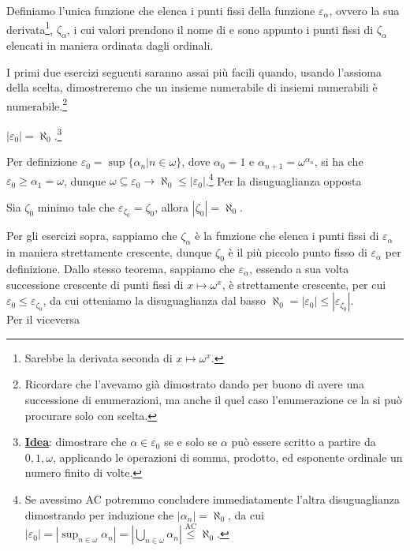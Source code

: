 \begin{definition}
	Definiamo l'unica funzione che elenca i punti fissi della funzione $\varepsilon_\alpha$, ovvero la sua derivata\footnote{Sarebbe la derivata seconda di $x \mapsto \omega^x$.}, $\zeta_\alpha$, i cui valori prendono il nome di  e sono appunto i punti fissi di $\zeta_\alpha$ elencati in maniera ordinata dagli ordinali.
\end{definition}

I primi due esercizi seguenti saranno assai pi\`u facili quando, usando l'assioma della scelta, dimostreremo che un insieme numerabile di insiemi numerabili \`e numerabile.\footnote{Ricordare che l'avevamo gi\`a dimostrato dando per buono di avere una successione di enumerazioni,
ma anche il quel caso l'enumerazione ce la si pu\`o procurare solo con scelta.}

\begin{exercise}[\textcolor{red}{$\star$ Difficile senza leggere l'idea sotto}]
	$|\varepsilon_0| = \aleph_0$.\footnote{\underline{\textbf{Idea}}: dimostrare che $\alpha \in \varepsilon_0$ se e solo se $\alpha$ pu\`o essere scritto a partire da $0,1,\omega$, applicando le operazioni di somma, prodotto, ed esponente ordinale un numero finito di volte.}
\end{exercise}

\begin{soln}
	Per definizione $\varepsilon_0 = \sup\{\alpha_n | n \in \omega\}$, dove $\alpha_0 = 1$ e $\alpha_{n+1}=\omega^{\alpha_n}$, si ha che $\varepsilon_0 \geq \alpha_1 = \omega$, dunque $\omega \subseteq \varepsilon_0 \to \aleph_0 \leq |\varepsilon_0|$.\footnote{Se avessimo AC
	potremmo concludere immediatamente l'altra disuguaglianza dimostrando per induzione che $|\alpha_n| = \aleph_0$, da cui $|\varepsilon_0| = |\sup_{n \in \omega} \alpha_n| = |\bigcup_{n \in \omega} \alpha_n| \overset{\text{AC}}{\leq} \aleph_0$.} Per la
	disuguaglianza opposta
\end{soln}

\begin{exercise}[\textcolor{red}{$\star \star$ Ostico}]
	Sia $\zeta_0$ minimo tale che $\varepsilon_{\zeta_0} = \zeta_0$, allora $|\zeta_0| = \aleph_0$.
\end{exercise}

\begin{soln}
	Per gli esercizi sopra, sappiamo che $\zeta_\alpha$ \`e la funzione che elenca i punti fissi di $\varepsilon_\alpha$ in maniera strettamente crescente, dunque $\zeta_0$ \`e il pi\`u piccolo punto fisso di $\varepsilon_\alpha$ per definizione.
	Dallo stesso teorema, sappiamo che $\varepsilon_\alpha$, essendo a sua volta successione crescente di punti fissi di $x \mapsto \omega^x$, \`e strettamente crescente, per cui $\varepsilon_0 \leq \varepsilon_{\zeta_0}$, da cui otteniamo la disuguaglianza dal basso $\aleph_0 = |\varepsilon_0| \leq |\varepsilon_{\zeta_0}|$.\\
	Per il viceversa
\end{soln}


